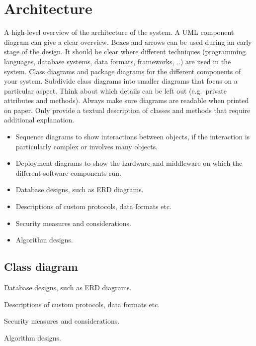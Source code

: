 \documentclass[10pt]{extarticle} %
\begin{document}
    \section{Architecture}
    A high-level overview of the architecture of the system.
    A UML component diagram can give a clear overview.
    Boxes and arrows can be used during an early stage of the design.
    It should be clear where different techniques (programming languages, database systems, data formats, frameworks, ..) are used in the system.
    Class diagrams and package diagrams for the different components of your system.
    Subdivide class diagrams into smaller diagrams that focus on a particular aspect.
    Think about which details can be left out (e.g.\ private attributes and methods).
    Always make sure diagrams are readable when printed on paper.
    Only provide a textual description of classes and methods that require additional explanation.
    \begin{itemize}
              \item Sequence diagrams to show interactions between objects, if the interaction is particularly complex or involves many objects.
              \item Deployment diagrams to show the hardware and middleware on which the different software components run.
              \item Database designs, such as ERD diagrams.
              \item Descriptions of custom protocols, data formats etc.
              \item Security measures and considerations.
              \item Algorithm designs.
    \end{itemize}

    \subsection[class_diagram]{Class diagram}

    Database designs, such as ERD diagrams.

    Descriptions of custom protocols, data formats etc.

    Security measures and considerations.

    Algorithm designs.
\end{document}
